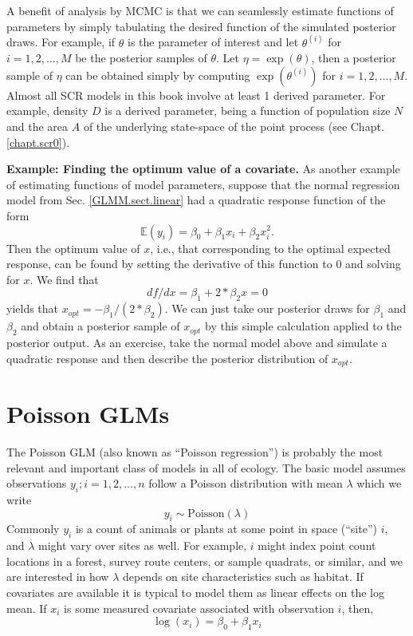 A benefit of analysis by MCMC is that we can seamlessly estimate
functions of parameters by simply tabulating the desired function of
the simulated posterior draws. For example, if $\theta$ is the
parameter of interest and let $\theta^{(i)}$ for $i=1,2,\ldots,M$ be
the posterior samples of $\theta$. Let $\eta = \exp(\theta)$, then a
posterior sample of $\eta$ can be obtained simply by computing
$\exp(\theta^{(i)})$ for $i=1,2,\ldots,M$. 
Almost all SCR models in this book involve at least 1 derived
parameter. For example, density $D$ is a derived parameter, being a
function of population size $N$ and the area $A$ of the underlying
state-space of the point process (see Chapt. \ref{chapt.scr0}).

{\bf Example: Finding the optimum value of a covariate.}
As another example of estimating functions of model parameters, suppose that the
normal regression model from Sec. \ref{GLMM.sect.linear} had a quadratic response function of the
form
\[
	\mathbb{E}(y_i) = \beta_0 + \beta_1 x_i + \beta_2 x_{i}^{2}.
\]
Then the optimum value of $x$, i.e., that corresponding to the optimal
expected response, can be found by setting the derivative of
this function to 0 and solving for $x$. We find that
\[
df/dx = \beta_1 +
2*\beta_2 x = 0
\]
yields that $x_{opt} = -\beta_1/(2*\beta_2)$.  We can just
take our posterior draws for $\beta_1$ and $\beta_2$ and obtain a
posterior sample of $x_{opt}$ by this simple calculation applied to
the posterior output. As an exercise, take
the normal model above and simulate a quadratic response and then
describe the posterior distribution of $x_{opt}$.


\section{Poisson GLMs}
\label{glms.sec.poisson}

The Poisson GLM (also known as ``Poisson regression'') is probably the
most relevant and important class of models in all of ecology. The
basic model assumes observations $y_{i}; i=1,2,...,n$ follow a Poisson
distribution with mean $\lambda$ which we write
\[
 	y_{i} \sim \mbox{Poisson}(\lambda)
\]
Commonly $y_{i}$ is a count of animals or plants at some point in
space (``site'') $i$, and $\lambda$ might vary over sites as well. For example, $i$ might index point
count locations in a forest, survey route centers, or sample quadrats, or
similar, and we are interested in how $\lambda$ depends on site
characteristics such as habitat.  If covariates are available it is typical to model them as
linear effects on the log mean. If $x_i$ is some measured covariate
associated with observation $i$, then,
\[
 	\log(x_i) = \beta_0  + \beta_1 x_i
\]


